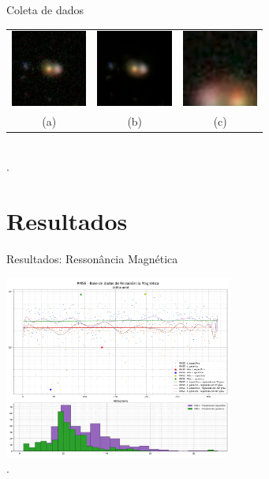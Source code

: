 \documentclass{beamer}
\begin{document}
    \begin{frame}{Coleta de dados}{\thesection \, \secname}

        \centering
        \begin{tabular}{c c c}
            \includegraphics[width=2.5cm]{img/samples/astronomy/astronomy_original.png}              &
            \includegraphics[width=2.5cm]{img/samples/astronomy/astronomy_non_specific_training.png} & 
            \includegraphics[width=2.5cm]{img/samples/astronomy/astronomy_specific_training.png}     \\
            (a) & (b) & (c)
        \end{tabular} \\
        .

    \end{frame}

    \section{Resultados}

    \begin{frame}{Resultados: Ressonância Magnética}{\thesection \, \secname}

        \centering
        \includegraphics[width=7.5cm]{img/resultados/rmse_mri_compound.png} \\
        .

    \end{frame}
\end{document}
